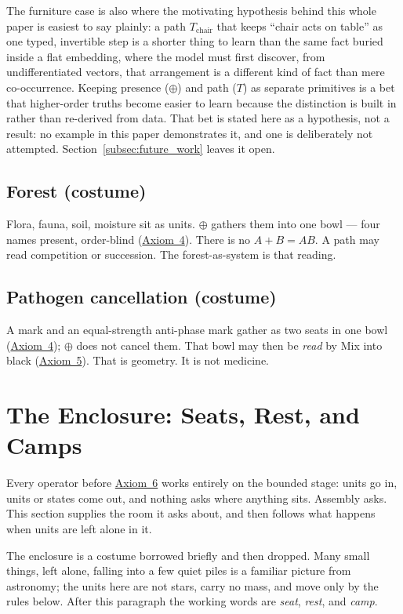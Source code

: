 \documentclass[12pt, a4paper]{article}
\begin{document}
The furniture case is also where the motivating hypothesis behind
this whole paper is easiest to say plainly: a path $T_{\mathrm{chair}}$
that keeps ``chair acts on table'' as one typed, invertible step is a
shorter thing to learn than the same fact buried inside a flat
embedding, where the model must first discover, from undifferentiated
vectors, that arrangement is a different kind of fact than mere
co-occurrence. Keeping presence ($\oplus$) and path ($T$) as separate
primitives is a bet that higher-order truths become easier to learn
because the distinction is built in rather than re-derived from data.
That bet is stated here as a hypothesis, not a result: no example in
this paper demonstrates it, and one is deliberately not attempted.
Section~\ref{subsec:future_work} leaves it open.

\subsection{Forest (costume)}
Flora, fauna, soil, moisture sit as units. $\oplus$ gathers them into
one bowl --- four names present, order-blind
(\hyperref[subsec:axiom_idempotence]{Axiom~4}).
There is no $A+B=AB$. A path may read competition or succession.
The forest-as-system is that reading.

\subsection{Pathogen cancellation (costume)}
A mark and an equal-strength anti-phase mark gather as two seats in
one bowl (\hyperref[subsec:axiom_idempotence]{Axiom~4}); $\oplus$ does not
cancel them. That bowl may then be \emph{read} by Mix into black
(\hyperref[subsec:axiom_interference]{Axiom~5}). That is geometry. It is not
medicine.

\section{The Enclosure: Seats, Rest, and Camps}
\label{sec:enclosure}

Every operator before \hyperref[subsec:axiom_assembly]{Axiom~6} works
entirely on the bounded stage: units go in, units or states come
out, and nothing asks where anything sits. Assembly asks. This
section supplies the room it asks about, and then follows what
happens when units are left alone in it.

The enclosure is a costume borrowed briefly and then dropped. Many
small things, left alone, falling into a few quiet piles is a
familiar picture from astronomy; the units here are not stars, carry
no mass, and move only by the rules below. After this paragraph the
working words are \emph{seat}, \emph{rest}, and \emph{camp}.
\end{document}

